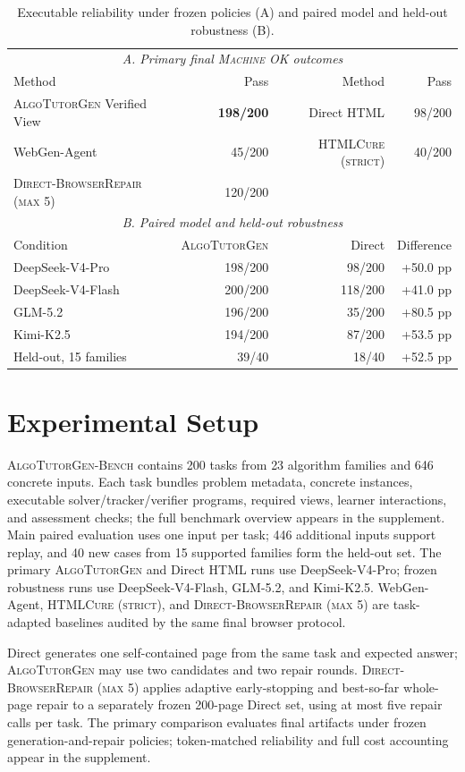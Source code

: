 \documentclass[letterpaper]{article}
\newcommand{\system}{\textsc{AlgoTutorGen}}
\newcommand{\machineok}{\textsc{Machine OK}}
\newcommand{\benchmarkname}{\textsc{AlgoTutorGen-Bench}}
\newcommand{\dbr}{\textsc{Direct-BrowserRepair (max 5)}}
\newcommand{\htmlcure}{\textsc{HTMLCure (strict)}}
\begin{document}
\begin{table}[t]
\centering
\small
\setlength{\tabcolsep}{6pt}
\begin{tabular}{lrrr}
\toprule
\multicolumn{4}{c}{\textit{A. Primary final \machineok{} outcomes}}\\
Method & Pass & Method & Pass \\
\midrule
\system{} Verified View & \textbf{198/200} & Direct HTML & 98/200 \\
WebGen-Agent & 45/200 & \htmlcure{} & 40/200 \\
\dbr{} & 120/200 & & \\
\midrule
\multicolumn{4}{c}{\textit{B. Paired model and held-out robustness}}\\
Condition & \system{} & Direct & Difference \\
\midrule
DeepSeek-V4-Pro & 198/200 & 98/200 & +50.0 pp \\
DeepSeek-V4-Flash & 200/200 & 118/200 & +41.0 pp \\
GLM-5.2 & 196/200 & 35/200 & +80.5 pp \\
Kimi-K2.5 & 194/200 & 87/200 & +53.5 pp \\
Held-out, 15 families & 39/40 & 18/40 & +52.5 pp \\
\bottomrule
\end{tabular}
\caption{Executable reliability under frozen policies (A) and paired
model and held-out robustness (B).}
\label{tab:reliability-main}
\end{table}

\section{Experimental Setup}
\label{sec:setup}

\benchmarkname{} contains 200 tasks from 23 algorithm families and 646
concrete inputs. Each task bundles problem metadata, concrete instances,
executable solver/tracker/verifier programs, required views, learner
interactions, and assessment checks; the full benchmark overview appears
in the supplement.
Main paired evaluation uses one input per task; 446 additional inputs
support replay, and 40 new cases from 15 supported families form the
held-out set. The primary \system{} and Direct HTML
runs use DeepSeek-V4-Pro; frozen robustness runs use
DeepSeek-V4-Flash, GLM-5.2, and Kimi-K2.5. WebGen-Agent,
\htmlcure{}, and \dbr{} are task-adapted baselines
audited by the same final browser protocol.

Direct generates one self-contained page from the same task and
expected answer; \system{} may use two candidates and two repair rounds.
\dbr{} applies adaptive early-stopping and best-so-far whole-page repair
to a separately frozen 200-page Direct set, using at most five repair
calls per task. The primary comparison evaluates final artifacts under
frozen generation-and-repair policies; token-matched reliability and
full cost accounting appear in the supplement.
\end{document}
